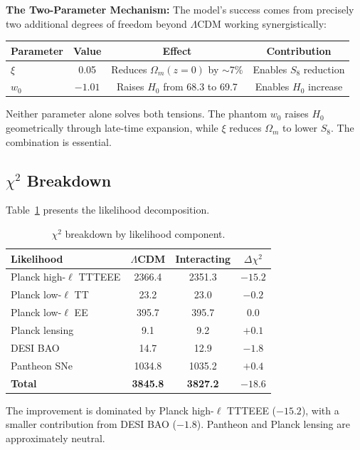 \documentclass[twocolumn,showpacs,preprintnumbers,amsmath,amssymb,prd]{revtex4-2}
\begin{document}
\textbf{The Two-Parameter Mechanism:} The model's success comes from precisely two additional degrees of freedom beyond $\Lambda$CDM working synergistically:

\begin{center}
\begin{tabular}{lccc}
\toprule
Parameter & Value & Effect & Contribution \\
\midrule
$\xi$ & 0.05 & Reduces $\Omega_m(z=0)$ by $\sim$7\% & Enables $S_8$ reduction \\
$w_0$ & $-1.01$ & Raises $H_0$ from 68.3 to 69.7 & Enables $H_0$ increase \\
\bottomrule
\end{tabular}
\end{center}

Neither parameter alone solves both tensions. The phantom $w_0$ raises $H_0$ geometrically through late-time expansion, while $\xi$ reduces $\Omega_m$ to lower $S_8$. The combination is essential.

\subsection{$\chi^2$ Breakdown}

Table~\ref{tab:chi2} presents the likelihood decomposition.

\begin{table}[h]
\centering
\begin{tabular}{lccc}
\toprule
Likelihood & $\Lambda$CDM & Interacting & $\Delta\chi^2$ \\
\midrule
Planck high-$\ell$ TTTEEE & 2366.4 & 2351.3 & $\mathbf{-15.2}$ \\
Planck low-$\ell$ TT & 23.2 & 23.0 & $-0.2$ \\
Planck low-$\ell$ EE & 395.7 & 395.7 & $0.0$ \\
Planck lensing & 9.1 & 9.2 & $+0.1$ \\
DESI BAO & 14.7 & 12.9 & $\mathbf{-1.8}$ \\
Pantheon SNe & 1034.8 & 1035.2 & $+0.4$ \\
\midrule
\textbf{Total} & \textbf{3845.8} & \textbf{3827.2} & $\mathbf{-18.6}$ \\
\bottomrule
\end{tabular}
\caption{$\chi^2$ breakdown by likelihood component.}
\label{tab:chi2}
\end{table}

The improvement is dominated by Planck high-$\ell$ TTTEEE ($-15.2$), with a smaller contribution from DESI BAO ($-1.8$). Pantheon and Planck lensing are approximately neutral.
\end{document}

